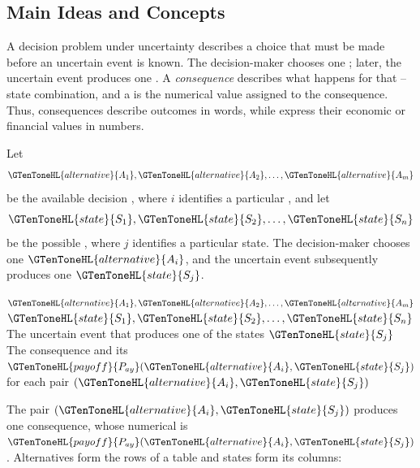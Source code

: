 	\subsection{Main Ideas and Concepts}
	\label{sec:main-ideas-and-concepts}
	
	A decision problem under uncertainty describes a choice that must be made before an uncertain event is known. The decision-maker chooses one \emph{}; later, the uncertain event produces one \emph{  }. A \emph{consequence} describes what happens for that --state combination, and a \emph{} is the numerical value assigned to the consequence. Thus, consequences describe outcomes in words, while  express their economic or financial values in numbers.
	
	Let
	\[
	\GTenToneHL{alternative}{A_1},\GTenToneHL{alternative}{A_2},\ldots,\GTenToneHL{alternative}{A_m}
	\]
	be the available decision , where $i$ identifies a particular , and let
	\[
	\GTenToneHL{state}{S_1},\GTenToneHL{state}{S_2},\ldots,\GTenToneHL{state}{S_n}
	\]
	be the possible   , where $j$ identifies a particular state. The decision-maker chooses one $\GTenToneHL{alternative}{A_i}$, and the uncertain event subsequently produces one $\GTenToneHL{state}{S_j}$.
	
	\DecisionElementsTable
	{$\GTenToneHL{alternative}{A_1},\GTenToneHL{alternative}{A_2},\ldots,\GTenToneHL{alternative}{A_m}$}
	{$\GTenToneHL{state}{S_1},\GTenToneHL{state}{S_2},\ldots,\GTenToneHL{state}{S_n}$}
	{The uncertain event that produces one of the states $\GTenToneHL{state}{S_j}$}
	{The consequence and its  $\GTenToneHL{payoff}{P_{ay}}(\GTenToneHL{alternative}{A_i},\GTenToneHL{state}{S_j})$ for each pair $(\GTenToneHL{alternative}{A_i},\GTenToneHL{state}{S_j})$}
	
	The pair $(\GTenToneHL{alternative}{A_i},\GTenToneHL{state}{S_j})$ produces one consequence, whose numerical  is $\GTenToneHL{payoff}{P_{ay}}(\GTenToneHL{alternative}{A_i},\GTenToneHL{state}{S_j})$. Alternatives form the rows of a  table and states form its columns:
	
